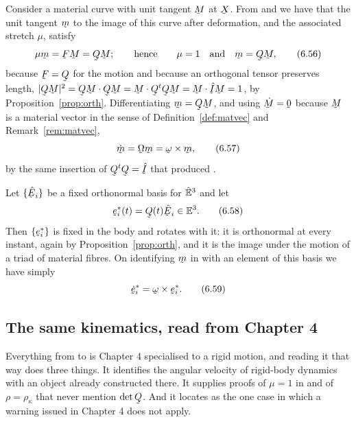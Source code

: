 Consider a material curve with unit tangent $\bM$ at $\bX$. From
 and  we have that the unit tangent $\bm$ to the
image of this curve after deformation, and the associated stretch
$\mu$, satisfy
\begin{equation}
   \mu\bm=\bF\bM=\bQ\bM;\qquad\text{hence}\qquad
   \mu=1\quad\text{and}\quad\bm=\bQ\bM ,
   \tag{6.56}\label{eq:6.56}
\end{equation}
because $\bF=\bQ$ for the motion  and because an orthogonal
tensor preserves length, $|\bQ\bM|^{2}=\ip{\bQ\bM}{\bQ\bM}
=\ip\bM{\bQ^{t}\bQ\bM}=\ip\bM{\hI\bM}=1$, by
Proposition~\ref{prop:orth}. Differentiating $\bm=\bQ\bM$, and using
$\dot\bM=\bze$ because $\bM$ is a material vector in the sense of
Definition~\ref{def:matvec} and Remark~\ref{rem:matvec},
\begin{equation}
   \dot\bm=\bOm\bm=\bom\times\bm ,
   \tag{6.57}\label{eq:6.57}
\end{equation}
by the same insertion of $\bQ^{t}\bQ=\hI$ that produced .

Let $\{\hbE_{i}\}$ be a fixed orthonormal basis for $\hat{\mathbb{E}}^{3}$ and let
\begin{equation}
   \be^{*}_{i}(t)=\bQ(t)\hbE_{i}\in\Vt .
   \tag{6.58}\label{eq:6.58}
\end{equation}
Then $\{\be^{*}_{i}\}$ is fixed in the body and rotates with it: it is
orthonormal at every instant, again by
Proposition~\ref{prop:orth}, and it is the image under the motion of a
triad of material fibres. On identifying $\bm$ in  with an
element of this basis we have simply
\begin{equation}
   \dot{\be}^{*}_{i}=\bom\times\be^{*}_{i} .
   \tag{6.59}\label{eq:6.59}
\end{equation}

\subsection*{The same kinematics, read from Chapter 4}

Everything from  to  is Chapter 4 specialised to a
rigid motion, and reading it that way does three things. It identifies
the angular velocity of rigid-body dynamics with an object already
constructed there. It supplies proofs of $\mu=1$ in  and of
$\rho=\rho_{\kappa}$ that never mention $\det\bQ$. And it locates
 as the one case in which a warning issued in Chapter 4 does
not apply.

